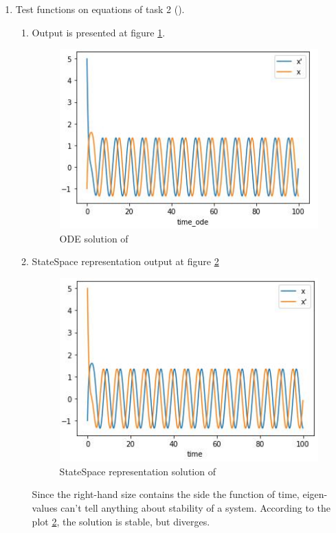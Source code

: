\documentclass[12pt,letterpaper]{article}
\begin{document}
\begin{enumerate}[leftmargin=!,labelindent=5pt]
    \item Test functions on equations of task 2 ().
    \begin{enumerate}
        \item Output is presented at figure \ref{fig:ODE_plot}.
             \begin{figure}[H]
                 \centering
                \includegraphics[width=15cm]{images/output/ode.jpg}
                \caption{ODE solution of }
                \label{fig:ODE_plot}
            \end{figure}
        \item StateSpace representation output at figure \ref{fig:SS_ODE_plot}
            \begin{figure}[H]
            \centering
            \includegraphics[width=15cm]{images/output/SS_ODE_plot.jpg}
            \caption{StateSpace representation solution of }
            \label{fig:SS_ODE_plot}
        \end{figure}
        
        Since the right-hand size contains the side the function of time, eigen-values can't tell anything about stability of a system. According to the plot \ref{fig:SS_ODE_plot}, the solution is stable, but diverges.
    \end{enumerate}
\end{enumerate}
\end{document}
